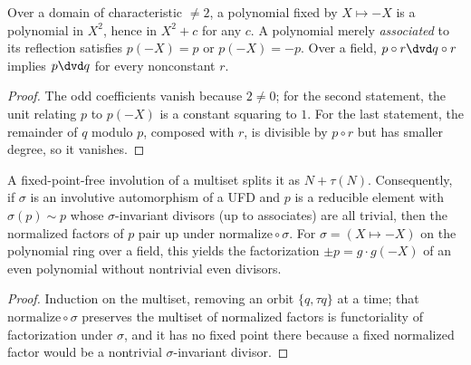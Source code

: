 \begin{lemma}
  \label{lem:evenpoly}
  \leanok
  Over a domain of characteristic $\ne 2$, a polynomial fixed by $X \mapsto -X$ is a polynomial
  in $X^2$, hence in $X^2 + c$ for any $c$. A polynomial merely \emph{associated} to its
  reflection satisfies $p(-X) = p$ or $p(-X) = -p$. Over a field, $p \circ r \dvd q \circ r$
  implies $p \dvd q$ for every nonconstant $r$.
\end{lemma}
\begin{proof}
  \leanok
  The odd coefficients vanish because $2 \ne 0$; for the second statement, the unit relating $p$
  to $p(-X)$ is a constant squaring to $1$. For the last statement, the remainder of $q$ modulo
  $p$, composed with $r$, is divisible by $p \circ r$ but has smaller degree, so it vanishes.
\end{proof}

\begin{lemma}
  \label{lem:involution}
  \leanok
  A fixed-point-free involution of a multiset splits it as $N + \tau(N)$. Consequently, if
  $\sigma$ is an involutive automorphism of a UFD and $p$ is a reducible element with
  $\sigma(p) \sim p$ whose $\sigma$-invariant divisors (up to associates) are all trivial, then
  the normalized factors of $p$ pair up under $\mathrm{normalize} \circ \sigma$. For
  $\sigma = (X \mapsto -X)$ on the polynomial ring over a field, this yields the factorization
  $\pm p = g \cdot g(-X)$ of an even polynomial without nontrivial even divisors.
\end{lemma}
\begin{proof}
  \leanok
  Induction on the multiset, removing an orbit $\{q, \tau q\}$ at a time; that
  $\mathrm{normalize} \circ \sigma$ preserves the multiset of normalized factors is
  functoriality of factorization under $\sigma$, and it has no fixed point there because a fixed
  normalized factor would be a nontrivial $\sigma$-invariant divisor.
\end{proof}
